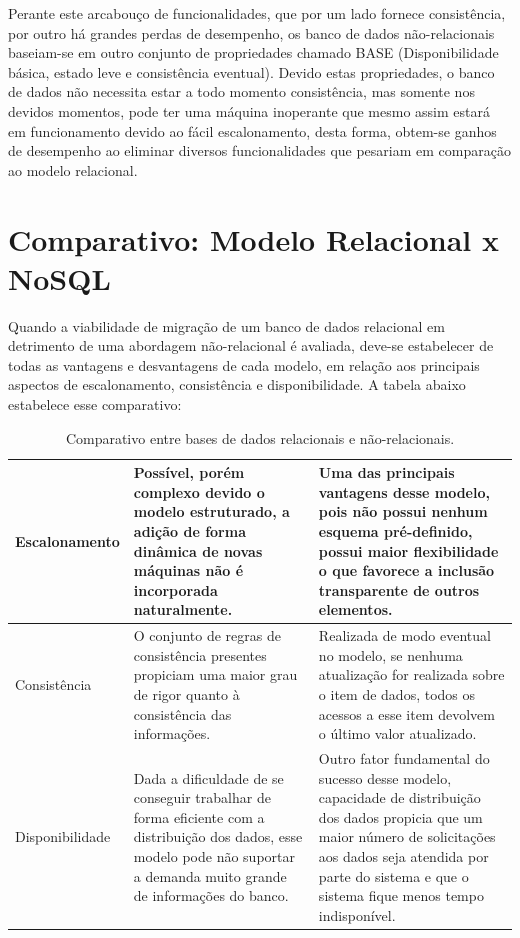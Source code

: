 \documentclass[12pt]{article}
\begin{document}
Perante este arcabouço de funcionalidades, que por um lado fornece consistência, por outro há grandes perdas de desempenho, os banco de dados não-relacionais baseiam-se em outro conjunto de propriedades chamado BASE (Disponibilidade básica, estado leve e consistência eventual). Devido estas propriedades, o banco de dados não necessita estar a todo momento consistência, mas somente nos devidos momentos, pode ter uma máquina inoperante que mesmo assim estará em funcionamento devido ao fácil escalonamento, desta forma, obtem-se ganhos de desempenho ao eliminar diversos funcionalidades que pesariam em comparação ao modelo relacional.\cite{brito2010bancos}


\section{Comparativo: Modelo Relacional x NoSQL}
\label{sec:vantagensedesvantagens}

Quando a viabilidade de migração de um banco de dados relacional em detrimento de uma abordagem não-relacional é avaliada, deve-se estabelecer de todas as vantagens e desvantagens de cada modelo, em relação aos principais aspectos de escalonamento, consistência e disponibilidade. A tabela abaixo estabelece esse comparativo:

\begin{table}[h]
\caption{Comparativo entre bases de dados relacionais e não-relacionais. \cite{brito2010bancos}}
\begin{center}
\begin{tabular}{p{2.7cm} | p{5cm} | p{5cm}}
\hline
Escalonamento & Possível, porém complexo devido o modelo estruturado, a adição de forma dinâmica de novas máquinas não é incorporada naturalmente. & Uma das principais vantagens desse modelo, pois não possui nenhum esquema pré-definido, possui maior flexibilidade o que favorece a inclusão transparente de outros elementos. \\
\hline
Consistência & O conjunto de regras de consistência presentes propiciam uma maior grau de rigor quanto à consistência das informações. & Realizada de modo eventual no modelo, se nenhuma atualização for realizada sobre o item de dados, todos os acessos a esse item devolvem o último valor atualizado.\\
\hline
Disponibilidade & Dada a dificuldade de se conseguir trabalhar de forma eficiente com a distribuição dos dados, esse modelo pode não suportar a demanda muito grande de informações do banco. & Outro fator fundamental do sucesso desse modelo, capacidade de distribuição dos dados propicia que um maior número de solicitações aos dados seja atendida por parte do sistema e que o sistema fique menos tempo indisponível.\\
\hline
\end{tabular}
\end{center}
\end{table}
\end{document}
